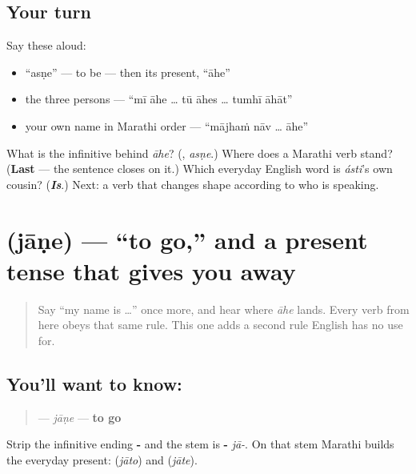 \subsection*{Your turn}
Say these aloud:

\begin{itemize}
\raggedright
  \item \textquotedblleft{}asṇe\textquotedblright{} — to be — then its present, \textquotedblleft{}āhe\textquotedblright{}
  \item the three persons — \textquotedblleft{}mī āhe … tū āhes … tumhī āhāt\textquotedblright{}
  \item your own name in Marathi order — \textquotedblleft{}mājhaṁ nāv … āhe\textquotedblright{}
\end{itemize}

\begin{tcolorbox}[breakable,colback=teal!4,colframe=teal!35!black,title={Before you move on}]
What is the infinitive behind \emph{āhe}? (\textbf{}, \emph{asṇe}.) Where does a Marathi verb stand? (\textbf{Last} — the sentence closes on it.) Which everyday English word is \emph{ásti}'s own cousin? (\emph{\textbf{Is}}.) Next: a verb that changes shape according to who is speaking.
\end{tcolorbox}
\section[\texorpdfstring{\mr{जाणे} (jāṇe)}{जाणे (jāṇe)}]{ (jāṇe) — \textquotedblleft{}to go,\textquotedblright{} and a present tense that gives you away}

\label{lesson:MR-C07-jane}



\begin{quote}
Say \textquotedblleft{}my name is …\textquotedblright{} once more, and hear where \emph{āhe} lands. Every verb from here obeys that same rule. This one adds a second rule English has no use for.
\end{quote}

\subsection*{You'll want to know: }
\begin{quote}
\textbf{} — \emph{jāṇe} — \textbf{to go}
\end{quote}

Strip the infinitive ending \textbf{-} and the stem is \textbf{-} \emph{jā-}. On that stem Marathi builds the everyday present: \textbf{} (\emph{jāto}) and \textbf{} (\emph{jāte}).


